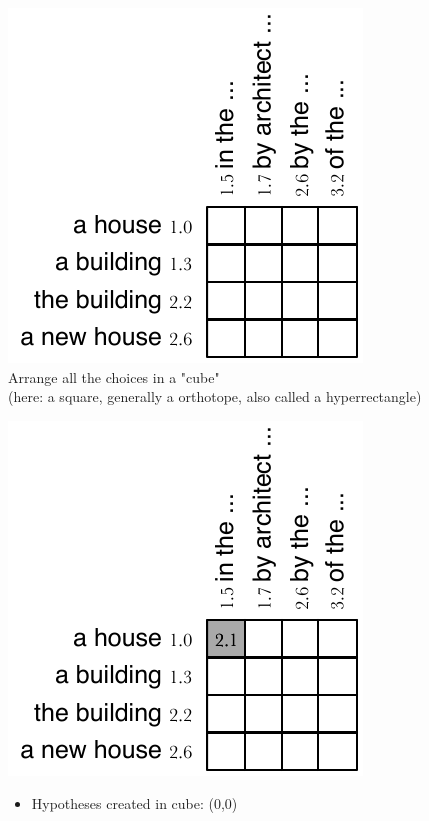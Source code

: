 \documentclass[landscape]{slides}
\begin{document}

\begin{center}
\includegraphics[scale=1.5]{cube-pruning-cube0.pdf}\\[10mm]
Arrange all the choices in a "cube"\\[5mm]
(here: a square, generally a orthotope, also called a hyperrectangle)\\[5mm]
\end{center}


\begin{center}
\includegraphics[scale=1.5]{cube-pruning-cube1.pdf}
\end{center}
\begin{itemize}
\item Hypotheses created in cube: (0,0)
\end{itemize}
\end{document}
